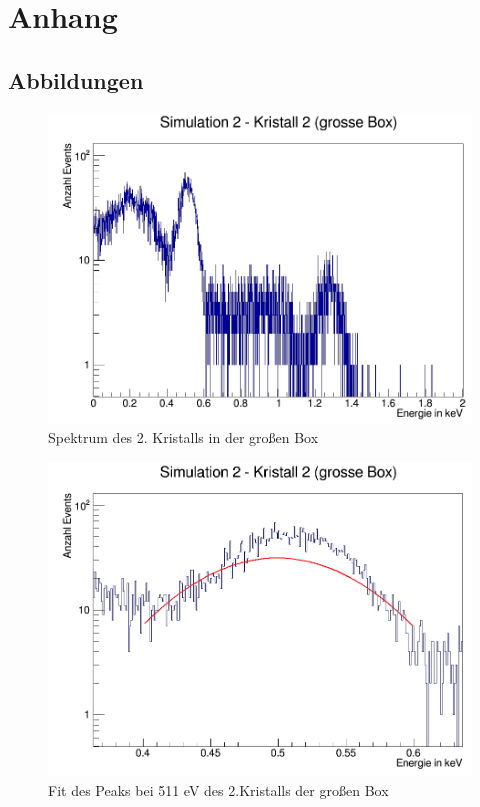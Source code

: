 \documentclass[a4paper,14pt,twoside]{article}
\begin{document}
			
\section{Anhang}
	\subsection{Abbildungen}
	
\begin{figure}[H]
	\begin{center}
		\includegraphics[width=0.7\linewidth]{Simulation2(2KGB)_ganz}
		\caption{Spektrum des 2. Kristalls in der großen Box}
		\label{}
	\end{center}
\end{figure}

\begin{figure}[H]
	\begin{center}
		\includegraphics[width=0.7\linewidth]{Simulation2(2KGB)_511_fitt}
		\caption{Fit des Peaks bei 511 eV des 2.Kristalls der großen Box}
		\label{}
	\end{center}
\end{figure}
\end{document}
